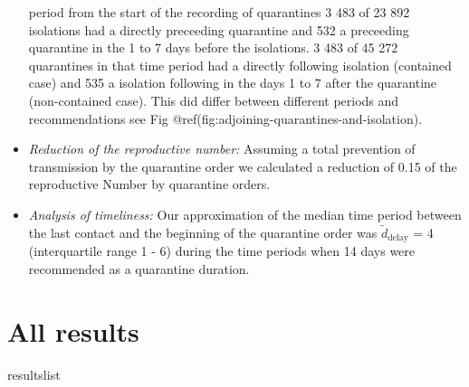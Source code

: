 \documentclass[
]{article}
\newenvironment{Shaded}{\begin{snugshade}}{\end{snugshade}}
\newcommand{\NormalTok}[1]{#1}
\begin{document}
\begin{itemize}
  period from the start of the recording of quarantines 3 483 of 23 892
  isolations had a directly preceeding quarantine and 532 a preceeding
  quarantine in the 1 to 7 days before the isolations. 3 483 of 45 272
  quarantines in that time period had a directly following isolation
  (contained case) and 535 a isolation following in the days 1 to 7
  after the quarantine (non-contained case). This did differ between
  different periods and recommendations see Fig
  @ref(fig:adjoining-quarantines-and-isolation).
\item
  \emph{Reduction of the reproductive number:} Assuming a total
  prevention of transmission by the quarantine order we calculated a
  reduction of 0.15 of the reproductive Number by quarantine orders.
\item
  \emph{Analysis of timeliness:} Our approximation of the median time
  period between the last contact and the beginning of the quarantine
  order was \(\tilde d_{\text{delay}}\) = 4 (interquartile range 1 - 6)
  during the time periods when 14 days were recommended as a quarantine
  duration.
\end{itemize}

\hypertarget{all-results}{%
\section{All results}\label{all-results}}

\begin{Shaded}
\begin{Highlighting}[]
\NormalTok{resultslist}
\end{Highlighting}
\end{Shaded}
\end{document}
